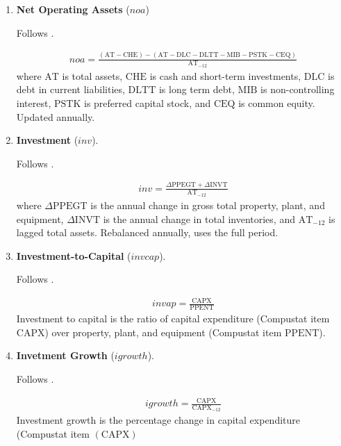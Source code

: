\begin{enumerate}
	
	
	\item \textbf{Net Operating Assets} ($noa$)
	
	Follows .
	
	\begin{align*}
		noa = \frac{ ( \mathrm{AT} - \mathrm{CHE}) - (\mathrm{AT} - \mathrm{DLC} - \mathrm{DLTT} - \mathrm{MIB} - \mathrm{PSTK} - \mathrm{CEQ} ) }{ \mathrm{AT}_{-12} }
	\end{align*}
	where $\mathrm{AT}$ is total assets, $\mathrm{CHE}$ is cash and short-term investments, $\mathrm{DLC}$ is debt in current liabilities, $\mathrm{DLTT}$ is long term debt, $\mathrm{MIB}$ is non-controlling interest, $\mathrm{PSTK}$ is preferred capital stock, and $\mathrm{CEQ}$ is common equity. Updated annually.
	
	
	
	\item \textbf{Investment} ($inv$).
	
	Follows .
	
	\begin{align*}
	inv = \frac{ \Delta \mathrm{PPEGT} + \Delta \mathrm{INVT} }{ \mathrm{AT}_{-12} }
	\end{align*}
	where $\Delta \mathrm{PPEGT}$ is the annual change in gross total property, plant, and equipment, $\Delta \mathrm{INVT}$ is the annual change in total inventories, and $\mathrm{AT}_{-12}$ is lagged total assets. Rebalanced annually, uses the full period.
	
	
	
	\item \textbf{Investment-to-Capital} ($invcap$). 
	
	Follows . 
	
	\begin{align*}
		invap = \frac{ \mathrm{CAPX} }{ \mathrm{PPENT} }
	\end{align*}
	Investment to capital is the ratio of capital expenditure (Compustat item $\mathrm{CAPX}$) over property, plant, and equipment (Compustat item $\mathrm{PPENT}$).
	
	
	
	\item \textbf{Invetment Growth} ($igrowth$). 
	
	Follows . 
	
	\begin{align*}
		igrowth = \frac{ \mathrm{CAPX} }{ \mathrm{CAPX}_{-12} }
	\end{align*}
	Investment growth is the percentage change in capital expenditure (Compustat item $(\mathrm{CAPX})$
	

\end{enumerate}
